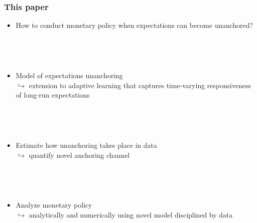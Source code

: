 \documentclass[10pt]{beamer}
\begin{document}
\begin{frame}
	\frametitle{This paper}
	
	\begin{itemize}
	\item How to conduct monetary policy when expectations can become unanchored?
	
	\
	
	\

	\item Model of expectations unanchoring  \\
	$\hookrightarrow$ extension to adaptive learning that captures time-varying responsiveness of long-run expectations
	
	
	\
	
	\
	
	\item Estimate how unanchoring takes place in data \\
	$\hookrightarrow$ quantify novel anchoring channel
	
	\
	
	\
	
	\item Analyze monetary policy \\
	$\hookrightarrow$ analytically and numerically using novel model disciplined by data

	\end{itemize}
	\end{frame}
\end{document}
